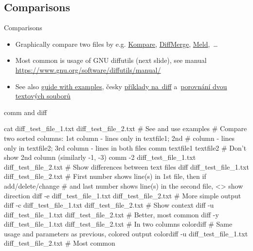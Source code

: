 \documentclass[compress, ucs, xelatex, 11pt, xcolor=svgnames, aspectratio=169,
	hyperref={
		bookmarks=true,
		unicode=true,
		colorlinks=true,
		pdftitle={Linux, command line and MetaCentrum},
		plainpages=false,
		pdfauthor={Vojtech Zeisek},
		pdfsubject={Course about use of Linux command line, writing shell scripts and using MetaCentrum of CESNET},
		pdfcreator={XeLaTeX},
		pdfkeywords={Linux, GNU, BASH, shell, command line, MetaCentrum},
		linkcolor=DarkRed, %
		anchorcolor=DarkBlue, %
		citecolor=Indigo, %
		filecolor=NavyBlue, %
		menucolor=DarkMagenta, %
		urlcolor=DarkBlue, %
		pdftex},
	url={hyphens, lowtilde} %
	]{beamer}
\renewcommand{\texttt}[1]{\colorbox{Beige}{{\ttfamily #1}}}
\begin{document}
\subsection{Comparisons}

\begin{frame}{Comparisons}
	\begin{itemize}
		\item Graphically compare two files by e.g. \href{https://apps.kde.org/kompare}{Kompare}, \href{https://sourcegear.com/diffmerge/}{DiffMerge}, \href{https://meldmerge.org/}{Meld},~\ldots
		\item Most common is usage of GNU diffutils (next slide), see manual \url{https://www.gnu.org/software/diffutils/manual/}
		\item See also \href{https://www.computerhope.com/unix/udiff.htm}{guide with examples}, česky \href{https://blog.root.cz/petrkrcmar/diff-jak-cist-vystup-z-porovnani-souboru/}{příklady na~diff} a~\href{https://www.root.cz/clanky/nastroje-pro-porovnani-obsahu-dvou-textovych-souboru/}{porovnání dvou textových souborů}
	\end{itemize}
	\begin{center}
		\texttt{[image: kompare.png]}
	\end{center}
\end{frame}

\begin{frame}[fragile]{comm and diff}
	\begin{bashcode}
    cat diff_test_file_1.txt diff_test_file_2.txt # See and use examples
    # Compare two sorted columns: 1st column - lines only in textfile1; 2nd
    # column - lines only in textfile2; 3rd column - lines in both files
    comm textfile1 textfile2
    # Don't show 2nd column (similarly -1, -3)
    comm -2 diff_test_file_1.txt diff_test_file_2.txt
    # Show differences between text files
    diff diff_test_file_1.txt diff_test_file_2.txt
      # First number shows line(s) in 1st file, then if add/delete/change
      # and last number shows line(s) in the second file, <> show direction
    diff -e diff_test_file_1.txt diff_test_file_2.txt # More simple output
    diff -c diff_test_file_1.txt diff_test_file_2.txt # Show context
    diff -u diff_test_file_1.txt diff_test_file_2.txt # Better, most common
    diff -y diff_test_file_1.txt diff_test_file_2.txt # In two columns
    colordiff # Same usage and parameters as previous, colored output
    colordiff -u diff_test_file_1.txt diff_test_file_2.txt # Most common
	\end{bashcode}
\end{frame}
\end{document}

